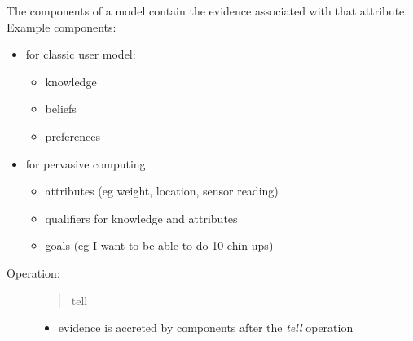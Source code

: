 \documentclass[letterpaper,10pt,english]{sphinxmanual}
\begin{document}
The components of a model contain the evidence associated with that attribute. Example components:
\begin{itemize}
\item {} 
for classic user model:
\begin{itemize}
\item {} 
knowledge

\item {} 
beliefs

\item {} 
preferences

\end{itemize}

\item {} 
for pervasive computing:
\begin{itemize}
\item {} 
attributes (eg weight, location, sensor reading)

\item {} 
qualifiers for knowledge and attributes

\item {} 
goals (eg I want to be able to do 10 chin-ups)

\end{itemize}

\end{itemize}
\begin{description}
\item[{Operation:}] \leavevmode\begin{quote}

tell
\end{quote}
\begin{itemize}
\item {} 
evidence is accreted by components after the \emph{tell} operation

\end{itemize}

\end{description}
\end{document}
